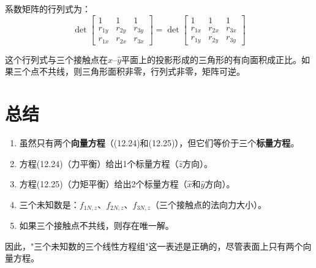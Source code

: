 \documentclass[12pt,a4paper]{article}
\begin{document}
系数矩阵的行列式为：
\begin{equation}
\det \begin{bmatrix}
1 & 1 & 1 \\
r_{1y} & r_{2y} & r_{3y} \\
r_{1x} & r_{2x} & r_{3x}
\end{bmatrix}
= \det \begin{bmatrix}
1 & 1 & 1 \\
r_{1x} & r_{2x} & r_{3x} \\
r_{1y} & r_{2y} & r_{3y}
\end{bmatrix}
\end{equation}

这个行列式与三个接触点在$\hat{x}$--$\hat{y}$平面上的投影形成的三角形的有向面积成正比。如果三个点不共线，则三角形面积非零，行列式非零，矩阵可逆。

\section{总结}

\begin{enumerate}
    \item 虽然只有两个\textbf{向量方程}（(12.24)和(12.25)），但它们等价于三个\textbf{标量方程}。
    \item 方程(12.24)（力平衡）给出1个标量方程（$\hat{z}$方向）。
    \item 方程(12.25)（力矩平衡）给出2个标量方程（$\hat{x}$和$\hat{y}$方向）。
    \item 三个未知数是：$f_{1N,z}$、$f_{2N,z}$、$f_{3N,z}$（三个接触点的法向力大小）。
    \item 如果三个接触点不共线，则存在唯一解。
\end{enumerate}

因此，"三个未知数的三个线性方程组"这一表述是正确的，尽管表面上只有两个向量方程。
\end{document}
